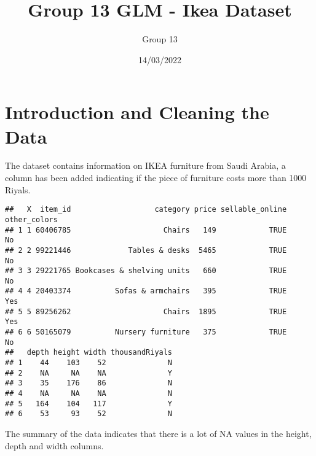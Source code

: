 \documentclass[
]{article}
\title{Group 13 GLM - Ikea Dataset}
\author{Group 13}
\date{14/03/2022}
\begin{document}
\maketitle

\hypertarget{sec:intro}{%
\section{Introduction and Cleaning the Data}\label{sec:intro}}

The dataset contains information on IKEA furniture from Saudi Arabia, a
column has been added indicating if the piece of furniture costs more
than 1000 Riyals.

\begin{verbatim}
##   X  item_id                   category price sellable_online other_colors
## 1 1 60406785                     Chairs   149            TRUE           No
## 2 2 99221446             Tables & desks  5465            TRUE           No
## 3 3 29221765 Bookcases & shelving units   660            TRUE           No
## 4 4 20403374          Sofas & armchairs   395            TRUE          Yes
## 5 5 89256262                     Chairs  1895            TRUE          Yes
## 6 6 50165079          Nursery furniture   375            TRUE           No
##   depth height width thousandRiyals
## 1    44    103    52              N
## 2    NA     NA    NA              Y
## 3    35    176    86              N
## 4    NA     NA    NA              N
## 5   164    104   117              Y
## 6    53     93    52              N
\end{verbatim}

The summary of the data indicates that there is a lot of NA values in
the height, depth and width columns.
\end{document}
